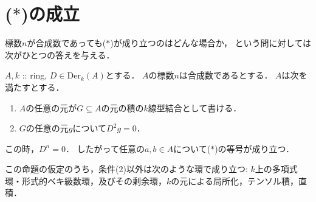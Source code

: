 \documentclass[a4paper]{jsarticle}
\newcommand{\Der}{\mathrm{Der}}
\begin{document}
\section{($*$)の成立}
標数$n$が合成数であっても($*$)が成り立つのはどんな場合か，
という問に対しては次がひとつの答えを与える．
\begin{Prop}
    $A, k$ :: ring, $D \in \Der_k(A)$とする．
    $A$の標数$n$は合成数であるとする．
    $A$は次を満たすとする．
    \begin{enumerate}[label=(\arabic*)]
        \item $A$の任意の元が$G \subseteq A$の元の積の$k$線型結合として書ける．
        \item $G$の任意の元$g$について$D^2g=0$．
    \end{enumerate}
    この時，$D^n=0$．
    したがって任意の$a,b \in A$について($*$)の等号が成り立つ．
\end{Prop}
この命題の仮定のうち，条件(2)以外は次のような環で成り立つ:
$k$上の多項式環・形式的ベキ級数環，及びその剰余環，$k$の元による局所化，テンソル積，直積．

\end{document}
